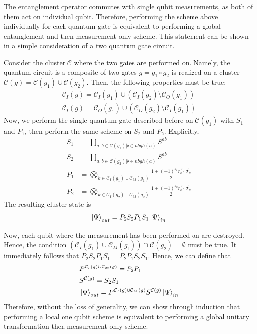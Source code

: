 \documentclass[twocolumn,secnumarabic,amssymb, nobibnotes, aps, prd]{revtex4-2}
\begin{document}
The entanglement operator commutes with single qubit measurements, as both of them act on individual qubit. Therefore, performing the scheme above individually for each quantum gate is equivalent to performing a global entanglement and then measurement only scheme. This statement can be shown in a simple consideration of a two quantum gate circuit.\par

Consider the cluster $\mathcal{C}$ where the two gates are performed on. Namely, the quantum circuit is a composite of two gates $g = g_1 \circ g_2$ is realized on a cluster $\mathcal{C}(g) = \mathcal{C}(g_1) \cup \mathcal{C}(g_2)$. Then, the following properties must be true:
\begin{align*}
    \mathcal{C}_I(g) = \mathcal{C}_I(g_1) \cup (\mathcal{C}_I(g_2) \setminus \mathcal{C}_O(g_1))\\
    \mathcal{C}_I(g) = \mathcal{C}_O(g_1) \cup (\mathcal{C}_O(g_2) \setminus \mathcal{C}_I(g_1))
\end{align*}
Now, we perform the single quantum gate described before on $\mathcal{C}(g_1)$ with $S_1$ and $P_1$, then perform the same scheme on $S_2$ and $P_2$. Explicitly,
\begin{align*}
    S_1 &= \prod_{a,b \in \mathcal{C}(g_1) | b\in nbgh(a)} S^{ab}\\
    S_2 &= \prod_{a,b \in \mathcal{C}(g_2) | b\in nbgh(a)} S^{ab}\\
    P_1 &= \bigotimes_{k\in\mathcal{C}_I(g_1) \cup \mathcal{C}_M(g_1)} \frac{1 + (-1)^{s_k}\vec{r_k}\cdot\vec{\sigma}_k}{2}\\
    P_2 &= \bigotimes_{k\in\mathcal{C}_I(g_2) \cup \mathcal{C}_M(g_2)} \frac{1 + (-1)^{s_k}\vec{r_k}\cdot\vec{\sigma}_k}{2}
\end{align*}
The resulting cluster state is
\begin{align*}
    \ket{\Psi}_{out} = P_2S_2P_1S_1 \ket{\Psi}_{in}
\end{align*} 

Now, each qubit where the measurement has been performed on are destroyed. Hence, the condition $(\mathcal{C}_I(g_1) \cup \mathcal{C}_M(g_1))\cap\mathcal{C}(g_2) = \emptyset$ must be true. It immediately follows that $P_2S_2P_1S_1 = P_2P_1S_2S_1$. Hence, we can define that
\begin{align*}
    &P^{\mathcal{C}_I(g)\cup \mathcal{C}_M(g)} = P_2P_1\\
    &S^{\mathcal{C}(g)} = S_2S_1\\
    &\ket{\Psi}_{out} = P^{\mathcal{C}_I(g)\cup \mathcal{C}_M(g)}S^{\mathcal{C}(g)} \ket{\Psi}_{in}
\end{align*}
Therefore, without the loss of generality, we can show through induction that performing a local one qubit scheme is equivalent to performing a global unitary transformation then measurement-only scheme.\par
\end{document}
